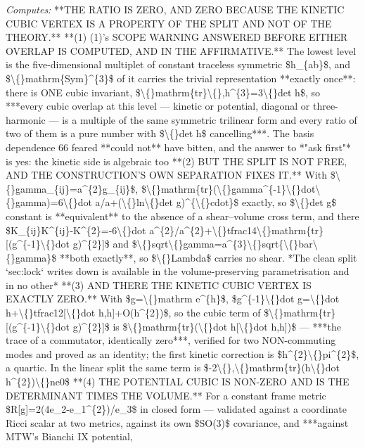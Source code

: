 \begin{description}
\emph{Computes:} **THE RATIO IS ZERO, AND ZERO BECAUSE THE KINETIC CUBIC VERTEX IS A PROPERTY OF THE SPLIT AND NOT OF THE THEORY.**  **(1) (1)'s SCOPE WARNING ANSWERED BEFORE EITHER OVERLAP IS COMPUTED, AND IN THE AFFIRMATIVE.** The lowest level is the five-dimensional multiplet of constant traceless symmetric \$h\_\{ab\}\$, and \$\textbackslash\{\}mathrm\{Sym\}\textasciicircum{}\{3\}\$ of it carries the trivial representation **exactly once**: there is ONE cubic invariant, \$\textbackslash\{\}mathrm\{tr\}\textbackslash\{\},h\textasciicircum{}\{3\}=3\textbackslash\{\}det h\$, so ***every cubic overlap at this level --- kinetic or potential, diagonal or three-harmonic --- is a multiple of the same symmetric trilinear form and every ratio of two of them is a pure number with \$\textbackslash\{\}det h\$ cancelling***. The basis dependence 66 feared **could not** have bitten, and the answer to *"ask first"* is yes: the kinetic side is algebraic too  **(2) BUT THE SPLIT IS NOT FREE, AND THE CONSTRUCTION'S OWN SEPARATION FIXES IT.** With \$\textbackslash\{\}gamma\_\{ij\}=a\textasciicircum{}\{2\}g\_\{ij\}\$, \$\textbackslash\{\}mathrm\{tr\}(\textbackslash\{\}gamma\textasciicircum{}\{-1\}\textbackslash\{\}dot\textbackslash\{\}gamma)=6\textbackslash\{\}dot a/a+(\textbackslash\{\}ln\textbackslash\{\}det g)\textasciicircum{}\{\textbackslash\{\}cdot\}\$ exactly, so \$\textbackslash\{\}det g\$ constant is **equivalent** to the absence of a shear--volume cross term, and there \$K\_\{ij\}K\textasciicircum{}\{ij\}-K\textasciicircum{}\{2\}=-6\textbackslash\{\}dot a\textasciicircum{}\{2\}/a\textasciicircum{}\{2\}+\textbackslash\{\}tfrac14\textbackslash\{\}mathrm\{tr\}[(g\textasciicircum{}\{-1\}\textbackslash\{\}dot g)\textasciicircum{}\{2\}]\$ and \$\textbackslash\{\}sqrt\textbackslash\{\}gamma=a\textasciicircum{}\{3\}\textbackslash\{\}sqrt\{\textbackslash\{\}bar\textbackslash\{\}gamma\}\$ **both exactly**, so \$\textbackslash\{\}Lambda\$ carries no shear. *The clean split `sec:lock` writes down is available in the volume-preserving parametrisation and in no other*  **(3)  AND THERE THE KINETIC CUBIC VERTEX IS EXACTLY ZERO.** With \$g=\textbackslash\{\}mathrm e\textasciicircum{}\{h\}\$, \$g\textasciicircum{}\{-1\}\textbackslash\{\}dot g=\textbackslash\{\}dot h+\textbackslash\{\}tfrac12[\textbackslash\{\}dot h,h]+O(h\textasciicircum{}\{2\})\$, so the cubic term of \$\textbackslash\{\}mathrm\{tr\}[(g\textasciicircum{}\{-1\}\textbackslash\{\}dot g)\textasciicircum{}\{2\}]\$ is \$\textbackslash\{\}mathrm\{tr\}(\textbackslash\{\}dot h[\textbackslash\{\}dot h,h])\$ --- ***the trace of a commutator, identically zero***, verified for two NON-commuting modes and proved as an identity; the first kinetic correction is \$h\textasciicircum{}\{2\}\textbackslash\{\}pi\textasciicircum{}\{2\}\$, a quartic. In the linear split the same term is \$-2\textbackslash\{\},\textbackslash\{\}mathrm\{tr\}(h\textbackslash\{\}dot h\textasciicircum{}\{2\})\textbackslash\{\}ne0\$  **(4) THE POTENTIAL CUBIC IS NON-ZERO AND IS THE DETERMINANT TIMES THE VOLUME.** For a constant frame metric \$R[g]=2(4e\_2-e\_1\textasciicircum{}\{2\})/e\_3\$ in closed form --- validated against a coordinate Ricci scalar at two metrics, against its own \$SO(3)\$ covariance, and ***against MTW's Bianchi IX potential, 
\end{description}
